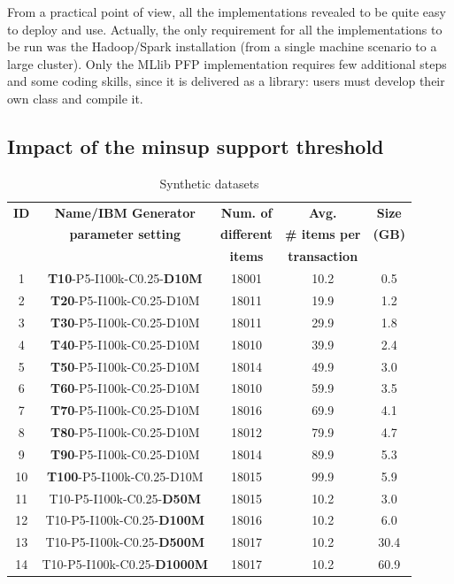 \documentclass[preprint,review,12pt]{elsarticle}
\begin{document}
From a practical point of view, all the implementations revealed to be quite easy to deploy and use. 
Actually, the only requirement for all the implementations to be run was the Hadoop/Spark installation 
(from a single machine scenario to a large cluster). 
Only the MLlib PFP implementation requires few additional steps and some coding skills, since it is delivered as a library: 
users must develop their own class and compile it.


\subsection{Impact of the minsup support threshold}
\label{minsup_exp}

\begin{table}[t]
\scriptsize
\begin{center}
\caption{Synthetic datasets}
\label{datasets_transactions}
\begin{tabular}{|c|c|c|c|c|}
\hline
{\bf ID }& {\bf Name/IBM Generator} &  {\bf Num. of} & {\bf  Avg.} & {\bf Size} \\
{\bf  }& {\bf  parameter setting} &  {\bf different} & {\bf \# items per } & {\bf (GB) } \\
{\bf  } & {\bf } & {\bf items} & {\bf  transaction } & {\bf } \\ \hline
 \hline
1 & \textbf{T10}-P5-I100k-C0.25-\textbf{D10M} &  18001 & 10.2 &  0.5 \\ \hline
2  & \textbf{T20}-P5-I100k-C0.25-D10M  & 18011 & 19.9 & 1.2 \\ \hline
3  & \textbf{T30}-P5-I100k-C0.25-D10M  & 18011 & 29.9 & 1.8 \\ \hline
4 & \textbf{T40}-P5-I100k-C0.25-D10M  & 18010 & 39.9 & 2.4 \\ \hline
5 & \textbf{T50}-P5-I100k-C0.25-D10M  & 18014 & 49.9 & 3.0 \\ \hline
6 & \textbf{T60}-P5-I100k-C0.25-D10M  & 18010 & 59.9 & 3.5 \\ \hline
7 & \textbf{T70}-P5-I100k-C0.25-D10M  & 18016 & 69.9 & 4.1 \\ \hline
8 & \textbf{T80}-P5-I100k-C0.25-D10M  & 18012 & 79.9 & 4.7 \\ \hline
9 & \textbf{T90}-P5-I100k-C0.25-D10M  & 18014 & 89.9 & 5.3 \\ \hline
10 & \textbf{T100}-P5-I100k-C0.25-D10M & 18015 & 99.9 & 5.9 \\ \hline
11 & T10-P5-I100k-C0.25-\textbf{D50M} &  18015 & 10.2 & 3.0 \\ \hline
12 & T10-P5-I100k-C0.25-\textbf{D100M} &  18016 & 10.2 & 6.0 \\ \hline
13 & T10-P5-I100k-C0.25-\textbf{D500M} &  18017 & 10.2 &  30.4 \\ \hline
14 & T10-P5-I100k-C0.25-\textbf{D1000M} &  18017 & 10.2 &  60.9 \\ \hline
\end{tabular}
\end{center}
\end{table}
\end{document}
